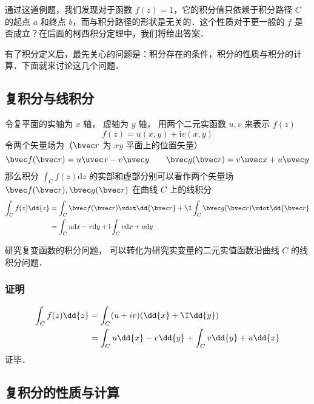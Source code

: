通过这道例题，我们发现对于函数 $f(z)=1$，它的积分值只依赖于积分路径 $C$ 的起点 $a$ 和终点 $b$，而与积分路径的形状是无关的．这个性质对于更一般的 $f$ 是否成立？在后面的柯西积分定理中，我们将给出答案．

有了积分定义后，最先关心的问题是：积分存在的条件，积分的性质与积分的计算．下面就来讨论这几个问题．

\subsection{复积分与线积分}
\begin{theorem}{}\label{CpxInt_the1}
令复平面的实轴为 $x$ 轴， 虚轴为 $y$ 轴， 用两个二元实函数 $u, v$ 来表示 $f(z)$
\begin{equation}
f (z) = u(x, y) + \mathrm iv(x, y)
\end{equation}
令两个矢量场为（$\bvec r$ 为 $xy$ 平面上的位置矢量）
\begin{equation}
\bvec f(\bvec r) = u\uvec x - v\uvec y
\qquad
\bvec g(\bvec r) = v\uvec x + u\uvec y
\end{equation}
那么积分 $\int_{C} f(z) \mathrm{d} z$ 的实部和虚部分别可以看作两个矢量场 $\bvec f(\bvec r), \bvec g(\bvec r)$ 在曲线 $C$ 上的线积分
\begin{equation}
\begin{aligned}
\int_{C} f(z) \dd{z} &= \int_C \bvec f(\bvec r) \vdot \dd{\bvec r} + \I \int_C \bvec g(\bvec r) \vdot \dd{\bvec r}\\
&= \int_{C} u \mathrm{d} x-v \mathrm{d} y+\mathrm{i} \int_{C} v \mathrm{d} x+u \mathrm{d} y
\end{aligned}
\end{equation}
\end{theorem}
研究复变函数的积分问题， 可以转化为研究实变量的二元实值函数沿曲线 $C$ 的线积分问题．

\subsubsection{证明}
\begin{equation}
\begin{aligned}
\int_C f(z) \dd{z} &= \int_C (u+iv)(\dd{x} + \I \dd{y})\\
&= \int_C u\dd{x} - v\dd{y} + \int_C v\dd{y} + u\dd{x}
\end{aligned}
\end{equation}
证毕．

\subsection{复积分的性质与计算}

